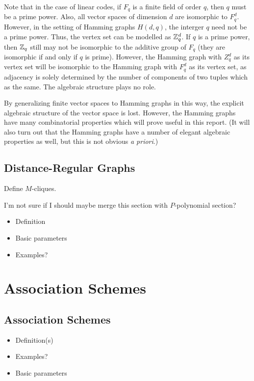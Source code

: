 \documentclass{report}
\begin{document}
    Note that in the case of linear codes, if $F_q$ is a finite field of order
    $q$, then $q$ must be a prime power.  Also, all vector spaces of dimension $d$
    are isomorphic to $F_q^d$.  However, in the setting of Hamming graphs $H(d,
    q)$, the interger $q$ need not be a prime power.  Thus, the vertex set can
    be modelled as $\mathbb{Z}_q^d$.  If $q$ is a prime power, then $\mathbb{Z}_q$ still may not
    be isomorphic to the additive group of $F_q$ (they are isomorphic if and only if
    $q$ is prime).  However, the Hamming graph with $Z_q^d$ as its vertex set
    will be isomorphic to the Hamming graph with $F_q^d$ as its vertex set, as
    adjacency is solely determined by the number of components of two tuples
    which as the same.  The algebraic structure plays no role.

    By generalizing finite vector spaces to Hamming graphs in this way, the
    explicit algebraic structure of the vector space is lost.  However, the
    Hamming graphs have many combinatorial properties which will prove useful in
    this report.  (It will also turn out that the Hamming graphs have a number
    of elegant algebraic properties as well, but this is not obvious \textit{a
    priori}.)

  \section{Distance-Regular Graphs}
    Define $M$-cliques.

    I'm not sure if I should maybe merge this section with $P$-polynomial
    section?

    \begin{itemize}
      \item Definition
      \item Basic parameters
      \item Examples?
    \end{itemize}

\chapter{Association Schemes}
  \section{Association Schemes}\label{sec:AS:AS}
    \begin{itemize}
      \item Definition(s)
      \item Examples?
      \item Basic parameters
    \end{itemize}
\end{document}
